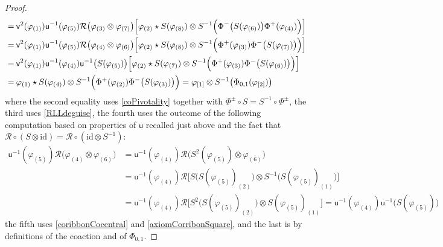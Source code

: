 \documentclass[11pt]{amsart}
\begin{document}
\begin{proof}
\begin{align*}
=\:& \mathsf{v}^2(\varphi_{(1)})\mathsf{u}^{-1}(\varphi_{(5)})\mathcal{R}\bigl(\varphi_{(3)} \otimes \varphi_{(7)}\bigr) \Bigl[\varphi_{(2)} \star S(\varphi_{(8)}) \otimes S^{-1}\Bigl( \Phi^-\bigl( S(\varphi_{(6)}) \bigr)\Phi^+( \varphi_{(4)}) \Bigr)\Bigr]\\
=\:& \mathsf{v}^2(\varphi_{(1)})\mathsf{u}^{-1}(\varphi_{(5)})\mathcal{R}\bigl(\varphi_{(4)} \otimes \varphi_{(6)}\bigr) \Bigl[\varphi_{(2)} \star S(\varphi_{(8)}) \otimes S^{-1}\Bigl( \Phi^+( \varphi_{(3)}) \Phi^-\bigl( S(\varphi_{(7)}) \bigr) \Bigr)\Bigr]\\
=\:& \mathsf{v}^2(\varphi_{(1)})\mathsf{u}^{-1}(\varphi_{(4)}) \mathsf{u}^{-1}\bigl( S(\varphi_{(5)}) \bigr) \Bigl[\varphi_{(2)} \star S(\varphi_{(7)}) \otimes S^{-1}\Bigl( \Phi^+( \varphi_{(3)}) \Phi^-\bigl( S(\varphi_{(6)}) \bigr) \Bigr)\Bigr]\\
=\:&\varphi_{(1)} \star S(\varphi_{(4)}) \otimes S^{-1}\Bigl( \Phi^+( \varphi_{(2)}) \Phi^-\bigl( S(\varphi_{(3)}) \bigr) \Bigr) = \varphi_{[1]} \otimes S^{-1}\bigl( \Phi_{0,1}(\varphi_{[2]}) \bigr)
\end{align*}
where the second equality uses \eqref{coPivotality} together with $\Phi^\pm \circ S = S^{-1} \circ \Phi^{\pm}$, the third uses \eqref{RLLdeguise}, the fourth uses the outcome of the following computation based on properties of $\mathsf{u}$ recalled just above and the fact that $\mathcal{R} \circ (S \otimes \mathrm{id}) = \mathcal{R} \circ (\mathrm{id} \otimes S^{-1})$:
\begin{align*}
\mathsf{u}^{-1}(\varphi_{(5)})\mathcal{R}\bigl(\varphi_{(4)} \otimes \varphi_{(6)}\bigr) &= \mathsf{u}^{-1}(\varphi_{(4)})\mathcal{R}\bigl(S^2(\varphi_{(5)}) \otimes \varphi_{(6)}\bigr)\\
&= \mathsf{u}^{-1}(\varphi_{(4)})\mathcal{R}\bigl[ S\bigl( S(\varphi_{(5)})_{(2)} \bigr) \otimes S^{-1}\bigl( S(\varphi_{(5)})_{(1)} \bigr) \bigr]\\
&= \mathsf{u}^{-1}(\varphi_{(4)})\mathcal{R}\bigl[ S^2\bigl( S(\varphi_{(5)})_{(2)} \bigr) \otimes  S(\varphi_{(5)})_{(1)} \bigr] = \mathsf{u}^{-1}(\varphi_{(4)}) \mathsf{u}^{-1}\bigl( S(\varphi_{(5)}) \bigr)
\end{align*}
the fifth uses \eqref{coribbonCocentral} and \eqref{axiomCorribonSquare}, and the last is by definitions of the coaction and of $\Phi_{0,1}$.


\end{proof}
\end{document}
